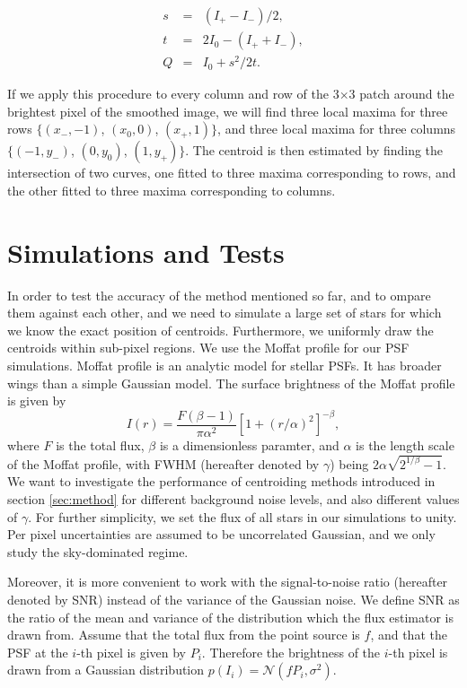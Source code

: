 \documentclass[12pt, preprint]{aastex}
\newcommand{\beq}{\begin{equation}}
\newcommand{\eeq}{\end{equation}}
\begin{document}
\begin{eqnarray}
s&=&(I_{+}-I_{-})/2, \\
t &=&2I_{0} - (I_{+}+I_{-}), \\
Q &=& I_{0} +s^{2}/2t.
\label{def}
\end{eqnarray}

If we apply this procedure to every column and row of the 3$\times$3 patch
around the brightest pixel of the smoothed image, we will find three local
maxima for three rows $\{(x_{-},-1)$, $(x_{0},0)$, $(x_{+},1)\}$, and three
local maxima for three columns $\{(-1,y_{-})$, $(0,y_{0})$, $(1,y_{+})\}$.
The centroid is then estimated by finding the intersection of two curves,
one fitted to three maxima corresponding to rows, and the other fitted
to three maxima corresponding to columns.

\section{Simulations and Tests}\label{sec:data}

In order to test the accuracy of the method mentioned so far, and to ompare them against each other,
and we need to simulate a large set of stars for which we know the exact position of centroids.
Furthermore, we uniformly draw the centroids within sub-pixel regions. 
We use the Moffat profile \citep{moffat} for our PSF simulations. 
Moffat profile is an analytic model for stellar PSFs. It has broader wings than
a simple Gaussian model. The surface brightness of the Moffat profile is given by
\beq
I(r) = \frac{F(\beta -1)}{\pi \alpha^{2}}[1+(r/\alpha)^{2}]^{-\beta},
\label{mof}
\eeq
where $F$ is the total flux, $\beta$ is a dimensionless paramter, and $\alpha$ is
the length scale of the Moffat profile, with FWHM (hereafter denoted by $\gamma$)
being $2\alpha\sqrt{2^{1/\beta}-1}$. 
We want to investigate the performance of centroiding methods introduced
in section \ref{sec:method} for different background noise levels, and also different
values of $\gamma$. For further simplicity, we set the flux of all stars in our
simulations to unity. Per pixel uncertainties are assumed to be uncorrelated Gaussian,
and we only study the sky-dominated regime.

Moreover, it is more convenient to work with the signal-to-noise ratio
(hereafter denoted by SNR) instead of the variance of the Gaussian noise.
We define SNR as the ratio of the mean and variance of the distribution
which the flux estimator is drawn from. Assume that the total flux from
the point source is $f$, and that the PSF at the $i$-th pixel is given
by $P_{i}$. Therefore the brightness of the $i$-th pixel is drawn from
a Gaussian distribution $p(I_{i}) = \mathcal{N}(fP_{i},\sigma^{2})$. 
\end{document}
